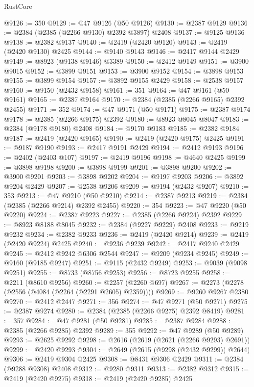 \begin{lexlean}{RustCore}
\begin{coremodule}
@9126 := 350
@9129 := @47 @9126 (@50 @9126)
@9130 := @2387 @9129
@9136 := @2384 (@2385 (@2266 @9130) @2392 @3897) @2408
@9137 := @9125 @9136
@9138 := @2382 @9137
@9140 := @2419 (@2420 @9120)
@9143 := @2419 (@2420 @9130) @2425
@9144 := @9140 @9143
@9146 := @2417 @9144 @2429
@9149 := @8923 (@9138 @9146) @3389
@9150 := @2412 @9149
@9151 := @3900 @9015
@9152 := @3899 @9151
@9153 := @3900 @9152
@9154 := @3898 @9153
@9155 := @3899 @9154
@9157 := @3892 @9155 @2429
@9158 := @2538 @9157
@9160 := @9150 (@2432 @9158)
@9161 := 351
@9164 := @47 @9161 (@50 @9161)
@9165 := @2387 @9164
@9170 := @2384 (@2385 (@2266 @9165) @2392 @2455)
@9171 := 352
@9174 := @47 @9171 (@50 @9171)
@9175 := @2387 @9174
@9178 := @2385 (@2266 @9175) @2392
@9180 := @8923 @8045 @8047
@9183 := @2384 (@9178 @9180) @2408
@9184 := @9170 @9183
@9185 := @2382 @9184
@9187 := @2419 (@2420 @9165)
@9190 := @2419 (@2420 @9175) @2425
@9191 := @9187 @9190
@9193 := @2417 @9191 @2429
@9194 := @2412 @9193
@9196 := @2402 (@2403 @107)
@9197 := @2419 @9196
@9198 := @4640 @2425
@9199 := @3898 @9198
@9200 := @3898 @9199
@9201 := @3898 @9200
@9202 := @3900 @9201
@9203 := @3898 @9202
@9204 := @9197 @9203
@9206 := @3892 @9204 @2429
@9207 := @2538 @9206
@9209 := @9194 (@2432 @9207)
@9210 := 353
@9213 := @47 @9210 (@50 @9210)
@9214 := @2387 @9213
@9219 := @2384 (@2385 (@2266 @9214) @2392 @2455)
@9220 := 354
@9223 := @47 @9220 (@50 @9220)
@9224 := @2387 @9223
@9227 := @2385 (@2266 @9224) @2392
@9229 := @8923 @8188 @8045
@9232 := @2384 (@9227 @9229) @2408
@9233 := @9219 @9232
@9234 := @2382 @9233
@9236 := @2419 (@2420 @9214)
@9239 := @2419 (@2420 @9224) @2425
@9240 := @9236 @9239
@9242 := @2417 @9240 @2429
@9245 := @2412 @9242 @6306 @2544
@9247 := @9209 (@9234 @9245)
@9249 := @9160 (@9185 @9247)
@9251 := @9115 (@2432 @9249)
@9253 := @9039 (@9098 @9251)
@9255 := @8733 (@8756 @9253)
@9256 := @8723 @9255
@9258 := @2211 (@8610 @9256)
@9260 := @2257 (@2260 @697)
@9267 := @2273 (@2278 (@2556 (@4084 (@2264 (@2291 @2605) @2359))))
@9269 := @9260 @9267 @2380
@9270 := @2412 @2447
@9271 := 356
@9274 := @47 @9271 (@50 @9271)
@9275 := @2387 @9274
@9280 := @2384 (@2385 (@2266 @9275) @2392 @8419)
@9281 := 357
@9284 := @47 @9281 (@50 @9281)
@9285 := @2387 @9284
@9288 := @2385 (@2266 @9285) @2392
@9289 := 355
@9292 := @47 @9289 (@50 @9289)
@9293 := @2625 @9292
@9298 := @2616 (@2619 (@2621 (@2266 @9293) @2691))
@9299 := @2420 @9293
@9304 := @2649 (@2615 (@9298 (@2432 @9299)) @2644)
@9306 := @2419 @9304 @2425
@9308 := @8431 @9306 @2429
@9311 := @2384 (@9288 @9308) @2408
@9312 := @9280 @9311
@9313 := @2382 @9312
@9315 := @2419 (@2420 @9275)
@9318 := @2419 (@2420 @9285) @2425

\end{coremodule}
\end{lexlean}
